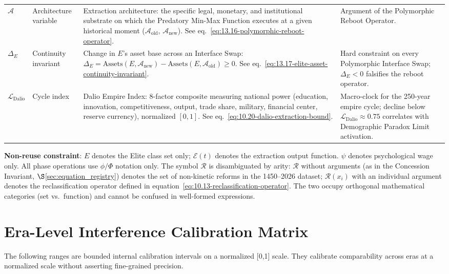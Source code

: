 \begin{longtable}{>{\raggedright}p{2.7cm} >{\raggedright}p{3.2cm} >{\raggedright}p{5.3cm} >{\raggedright\arraybackslash}p{3.3cm}}
$\mathcal{A}$ & Architecture variable & Extraction architecture: the specific legal, monetary, and institutional substrate on which the Predatory Min-Max Function executes at a given historical moment ($\mathcal{A}_{\text{old}}$, $\mathcal{A}_{\text{new}}$). See eq.~\eqref{eq:13.16-polymorphic-reboot-operator}. & Argument of the Polymorphic Reboot Operator. \\
$\Delta_E$ & Continuity invariant & Change in $E$'s asset base across an Interface Swap: $\Delta_E = \mathrm{Assets}(E, \mathcal{A}_{\text{new}}) - \mathrm{Assets}(E, \mathcal{A}_{\text{old}}) \geq 0$. See eq.~\eqref{eq:13.17-elite-asset-continuity-invariant}. & Hard constraint on every Polymorphic Interface Swap; $\Delta_E < 0$ falsifies the reboot operator. \\
$\mathcal{L}_{\text{Dalio}}$ & Cycle index & Dalio Empire Index: 8-factor composite measuring national power (education, innovation, competitiveness, output, trade share, military, financial center, reserve currency), normalized $[0,1]$. See eq.~\eqref{eq:10.20-dalio-extraction-bound}. & Macro-clock for the 250-year empire cycle; decline below $\mathcal{L}_{\text{Dalio}} \approx 0.75$ correlates with Demographic Paradox Limit activation. \\
\bottomrule
\end{longtable}

\textbf{Non-reuse constraint}: $E$ denotes the Elite class set only; $\mathcal{E}(t)$ denotes the extraction output function. $\psi$ denotes psychological wage only. All phase operations use $\phi/\Phi$ notation only. The symbol $\mathcal{R}$ is disambiguated by arity: $\mathcal{R}$ without arguments (as in the Concession Invariant, $\S$\ref{sec:equation_registry}) denotes the set of non-kinetic reforms in the 1450--2026 dataset; $\mathcal{R}(x_i)$ with an individual argument denotes the reclassification operator defined in equation~\eqref{eq:10.13-reclassification-operator}. The two occupy orthogonal mathematical categories (set vs.\ function) and cannot be confused in well-formed expressions.

\section{Era-Level Interference Calibration Matrix}

The following ranges are bounded internal calibration intervals on a normalized [0,1] scale. They calibrate comparability across eras at a normalized scale without asserting fine-grained precision.


